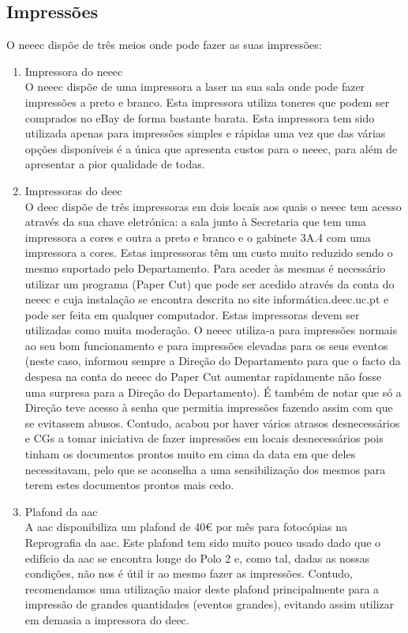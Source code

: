
\subsection{Impressões}

O \acrshort{neeec} dispõe de três meios onde pode fazer as suas impressões:
\begin{enumerate}
    \item Impressora do \acrshort{neeec}\\
    O \acrshort{neeec} dispõe de uma impressora a laser na sua sala onde pode fazer impressões a preto e branco. Esta impressora utiliza toneres que podem ser comprados no eBay de forma bastante barata. Esta impressora tem sido utilizada apenas para impressões simples e rápidas uma vez que das várias opções disponíveis é a única que apresenta custos para o \acrshort{neeec}, para além de apresentar a pior qualidade de todas.

    \item Impressoras do \acrshort{deec}\\
    O \acrshort{deec} dispõe de três impressoras em dois locais aos quais o \acrshort{neeec} tem acesso através da sua chave eletrónica: a sala junto à Secretaria que tem uma impressora a cores e outra a preto e branco e o gabinete 3A.4 com uma impressora a cores. Estas impressoras têm um custo muito reduzido sendo o mesmo suportado pelo Departamento. Para aceder às mesmas é necessário utilizar um programa (Paper Cut) que pode ser acedido através da conta do \acrshort{neeec} e cuja instalação se encontra descrita no site informática.deec.uc.pt e pode ser feita em qualquer computador. Estas impressoras devem ser utilizadas como muita moderação. O \acrshort{neeec} utiliza-a para impressões normais ao seu bom funcionamento e para impressões elevadas para os seus eventos (neste caso, informou sempre a Direção do Departamento para que o facto da despesa na conta do \acrshort{neeec} do Paper Cut aumentar rapidamente não fosse uma surpresa para a Direção do Departamento). É também de notar que só a Direção teve acesso à senha que permitia impressões fazendo assim com que se evitassem abusos. Contudo, acabou por haver vários atrasos desnecessários e CGs a tomar iniciativa de fazer impressões em locais desnecessários pois tinham os documentos prontos muito em cima da data em que deles necessitavam, pelo que se aconselha a uma sensibilização dos mesmos para terem estes documentos prontos mais cedo.

    \item Plafond da \acrshort{aac}\\
    A \acrshort{aac} disponibiliza um plafond de 40€ por mês para fotocópias na Reprografia da \acrshort{aac}. Este plafond tem sido muito pouco usado dado que o edifício da \acrshort{aac} se encontra longe do Polo 2 e, como tal, dadas as nossas condições, não nos é útil ir ao mesmo fazer as impressões. Contudo, recomendamos uma utilização maior deste plafond principalmente para a impressão de grandes quantidades (eventos grandes), evitando assim utilizar em demasia a impressora do \acrshort{deec}. 
\end{enumerate}

